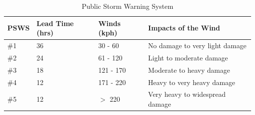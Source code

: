 \documentclass[runningheads]{llncs}
\begin{document}
\begin{table}[!htbp]
\centering
\caption{Public Storm Warning System}
\label{Table:PSWS}
\begin{tabular}{|p{1.2cm}|p{1.3cm}|p{1.4cm}|p{5.1cm}|}
\hline
PSWS & Lead Time (hrs) & Winds (kph) & Impacts of the Wind \\\hline
\#1 & 36 & 30 - 60 & No damage to very light damage \\
\#2 & 24	& 61 - 120 & Light to moderate damage	\\                                      
\#3 & 18 & 121 - 170 & Moderate to heavy damage \\
\#4 & 12 & 171 - 220 & Heavy to very heavy damage \\
\#5 & 12 & $>$ 220 & Very heavy to widespread damage \\
\hline
\end{tabular}
\end{table}



\end{document}
